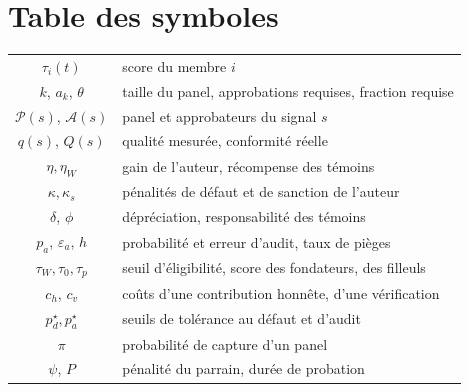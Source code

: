 \documentclass[11pt,a4paper]{article}
\theoremstyle{plain}
\theoremstyle{definition}
\theoremstyle{remark}
\newcommand{\1}{\mathbf{1}}
\begin{document}
\section{Table des symboles}

\begin{center}
\small
\begin{tabular}{cl}
\toprule
$\tau_i(t)$ & score du membre $i$ \\
$k$, $a_k$, $\theta$ & taille du panel, approbations requises, fraction requise \\
$\mathcal{P}(s)$, $\mathcal{A}(s)$ & panel et approbateurs du signal $s$ \\
$q(s)$, $Q(s)$ & qualité mesurée, conformité réelle \\
$\eta,\eta_W$ & gain de l'auteur, récompense des témoins \\
$\kappa,\kappa_s$ & pénalités de défaut et de sanction de l'auteur \\
$\delta$, $\phi$ & dépréciation, responsabilité des témoins \\
$p_a$, $\varepsilon_a$, $h$ & probabilité et erreur d'audit, taux de pièges \\
$\tau_W,\tau_0,\tau_p$ & seuil d'éligibilité, score des fondateurs, des filleuls \\
$c_h$, $c_v$ & coûts d'une contribution honnête, d'une vérification \\
$p^\star_d, p^\star_a$ & seuils de tolérance au défaut et d'audit \\
$\pi$ & probabilité de capture d'un panel \\
$\psi$, $P$ & pénalité du parrain, durée de probation \\
\bottomrule
\end{tabular}
\end{center}
\end{document}
